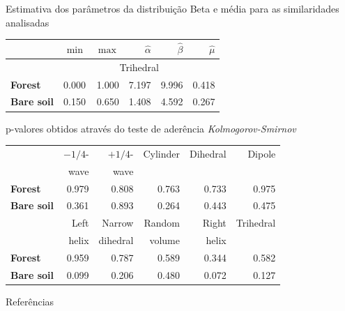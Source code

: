 \documentclass{beamer} %
\begin{document}
\begin{frame}{Estimativa dos parâmetros da distribuição Beta e média para as similaridades analisadas}
\begin{table}[hbt]
\centering
\begin{tabular}{lrrrrr}
\toprule
& $\min$ & $\max$ & $\widehat\alpha$ & $\widehat\beta$ & $\widehat\mu$\\ \midrule
& \multicolumn{5}{c}{Trihedral}\\
\cmidrule(lr){2-6}
\textbf{Forest} & 0.000 & 1.000 & 7.197 & 9.996 & 0.418\\
\textbf{Bare soil} & 0.150 & 0.650 & 1.408 & 4.592 & 0.267\\
\bottomrule
\end{tabular}
\end{table}
\end{frame}

\begin{frame}{p-valores obtidos através do teste de aderência \textit{Kolmogorov-Smirnov}}
\begin{table}[hbt]
\centering
\begin{tabular}{lrrrrr}
\toprule
& $-1/4$- & $+1/4$- & Cylinder & Dihedral & Dipole\\
& wave & wave & & &\\
\cmidrule(lr){2-6}
\textbf{Forest} & 0.979 & 0.808 & 0.763 & 0.733 & 0.975\\
\textbf{Bare soil} & 0.361 & 0.893 & 0.264 & 0.443 & 0.475\\
\midrule
& Left & Narrow & Random & Right & Trihedral\\
& helix & dihedral & volume & helix & \\
\cmidrule(lr){2-6}
\textbf{Forest} & 0.959 & 0.787 & 0.589 & 0.344 & 0.582\\
\textbf{Bare soil} & 0.099 & 0.206 & 0.480 & 0.072 & 0.127\\
\bottomrule
\end{tabular} 
\end{table}

\end{frame}

\begin{frame}{Referências}
    
    
\end{frame}
\end{document}
